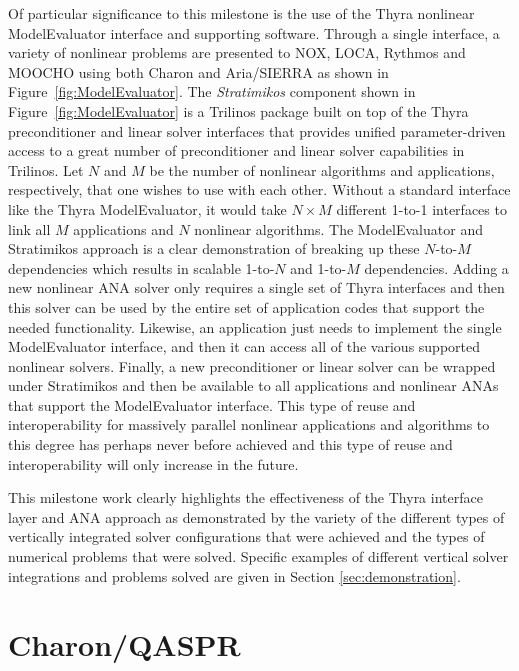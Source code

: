 \documentclass[pdf,ps2pdf,11pt]{SANDreport}
\begin{document}
Of particular significance to this milestone is the use of the Thyra nonlinear
ModelEvaluator interface and supporting software.  Through a single interface,
a variety of nonlinear problems are presented to NOX, LOCA, Rythmos and MOOCHO
using both Charon and Aria/SIERRA as shown in Figure~\ref{fig:ModelEvaluator}.
The {}\textit{Stratimikos} component shown in Figure~\ref{fig:ModelEvaluator}
is a Trilinos package built on top of the Thyra preconditioner and linear solver
interfaces that provides unified parameter-driven access to a great number of
preconditioner and linear solver capabilities in Trilinos.  Let $N$ and $M$ be
the number of nonlinear algorithms and applications, respectively, that one wishes
to use with each other.  Without a standard interface like the Thyra ModelEvaluator,
it would take $N {}\times M$ different 1-to-1 interfaces to link all $M$ applications
and $N$ nonlinear algorithms.  The ModelEvaluator
and Stratimikos approach is a clear demonstration of breaking up these $N$-to-$M$
dependencies which results in scalable 1-to-$N$ and 1-to-$M$ dependencies.  Adding
a new nonlinear ANA solver only requires a single set of Thyra interfaces and
then this solver can be used by the entire set of application codes that
support the needed functionality.  Likewise, an application just needs to
implement the single ModelEvaluator interface, and then it can access all of
the various supported nonlinear solvers.  Finally, a new preconditioner or
linear solver can be wrapped under Stratimikos and then be available to all
applications and nonlinear ANAs that support the ModelEvaluator interface.
This type of reuse and interoperability for massively parallel nonlinear
applications and algorithms to this degree has perhaps never before achieved and
this type of reuse and interoperability will only increase in the future.

This milestone work clearly highlights the effectiveness of the Thyra
interface layer and ANA approach as demonstrated by the variety of the
different types of vertically integrated solver configurations that were
achieved and the types of numerical problems that were solved.  Specific
examples of different vertical solver integrations and problems solved are
given in Section {}\ref{sec:demonstration}.


%
\section{Charon/QASPR}
%
\end{document}
